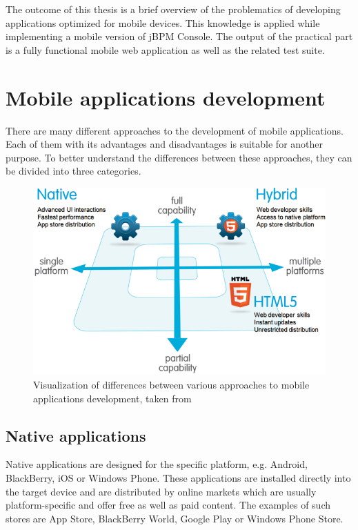 \documentclass[12pt,oneside,final]{fithesis2}
\begin{document}
The outcome of this thesis is a brief overview of the problematics of developing applications optimized for mobile devices.
This knowledge is applied while implementing a mobile version of jBPM Console.
The output of the practical part is a fully functional mobile web application as well as the related test suite.

\chapter{Mobile applications development}
\label{chap:chapter2}
There are many different approaches to the development of mobile applications.
Each of them with its advantages and disadvantages is suitable for another purpose.
To better understand the differences between these approaches, they can be divided into three categories.

\begin{figure}[ht!]
\centering
\includegraphics[width=\textwidth]{images/native-html5-hybrid.png}
\caption{Visualization of differences between various approaches to mobile applications development, taken from \cite{developerforce}}
\label{fig:native-html5-hybrid}
\end{figure}

\section{Native applications}
Native applications are designed for the specific platform, e.g. Android, BlackBerry, iOS or Windows Phone.
These applications are installed directly into the target device and are distributed by online markets which are usually platform-specific and offer free as well as paid content.
The examples of such stores are App Store\footnotemark{}, BlackBerry World\footnotemark{}, Google Play\footnotemark{} or Windows Phone Store\footnotemark{}.
\end{document}
